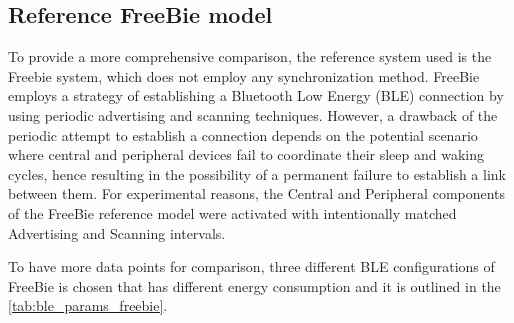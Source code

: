 \subsection{Reference FreeBie model}
To provide a more comprehensive comparison, the reference system used is the Freebie system, which does not employ any synchronization method. FreeBie employs a strategy of establishing a Bluetooth Low Energy (BLE) connection by using periodic advertising and scanning techniques. However, a drawback of the periodic attempt to establish a connection depends on the potential scenario where central and peripheral devices fail to coordinate their sleep and waking cycles, hence resulting in the possibility of a permanent failure to establish a link between them. For experimental reasons, the Central and Peripheral components of the FreeBie reference model were activated with intentionally matched Advertising and Scanning intervals. 

\noindent To have more data points for comparison, three different BLE configurations of FreeBie is chosen that has different energy consumption and it is outlined in  the \autoref{tab:ble_params_freebie}.

